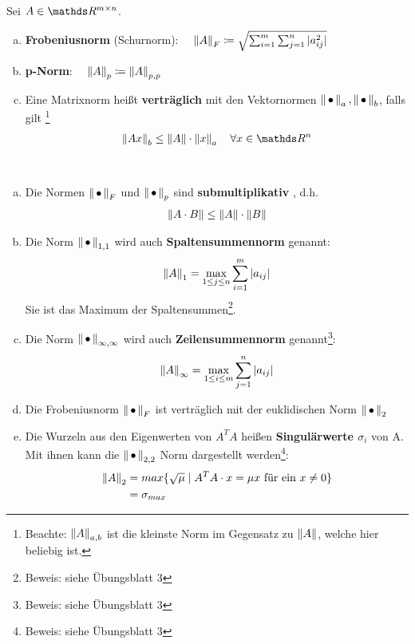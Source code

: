 \begin{Defe}
  \label{3.2.5}
  Sei $A\in \R^{m\times n}$.
  \begin{enumerate}[a)]
  \item \textbf{Frobeniusnorm} (Schurnorm):
    $ \quad \nn[A]_F \coloneqq \sqrt{\sum_{i=1}^{m}\sum_{j=1}^{n}|a_{ij}^2|}
    \index{Norm!Frobeniusnorm}$
  \item \textbf{p-Norm}: 
    $\quad \nn[A]_p \coloneqq \nn[A]_{p,p}
    \index{p-Norm}$
  \item Eine Matrixnorm heißt \textbf{verträglich} 
    mit den Vektornormen $\nn_a, \nn_b$, falls gilt
    \footnote{ Beachte: $\nn[A]_{a,b}$ ist die kleinste Norm 
      im Gegensatz zu $\nn[A]$, welche hier beliebig ist.}
    \begin{gather*}
      \nn[Ax]_b \leq \nn[A]\cdot \nn[x]_a \quad \forall x\in \R^n
    \end{gather*}
  \end{enumerate}
\end{Defe}
\begin{Beme}~
  \label{3.2.6}
  \begin{enumerate}[a)]
  \item Die Normen $\nn_F$ und $\nn_p$ sind 
    \textbf{submultiplikativ} , d.h.
    \begin{gather*}
      \nn[A\cdot B] \leq \nn[A]\cdot\nn[B]
    \end{gather*}
  \item Die Norm $\nn_{1,1}$ wird auch 
    \textbf{Spaltensummennorm} genannt:
    \begin{gather*}
      \nn[A]_1 = \max_{1\leq j \leq n}\sum_{i=1}^{m}|a_{ij}|
    \end{gather*}
    Sie ist das Maximum der Spaltensummen\footnote{Beweis: siehe Übungsblatt 3}.
  \item Die Norm $\nn_{\infty, \infty}$ wird auch 
    \textbf{Zeilensummennorm} 
    genannt\footnote{Beweis: siehe Übungsblatt 3}:
    \begin{gather*}
      \nn[A]_\infty = \max_{1\leq i \leq m}\sum_{j=1}^{n}|a_{ij}|
    \end{gather*}
  \item Die Frobeniusnorm $\nn_F$ ist verträglich 
    mit der euklidischen Norm $\nn_2$
  \item Die Wurzeln aus den Eigenwerten von $A^TA$ 
    heißen \textbf{Singulärwerte $\sigma_i$}  von A.
    Mit ihnen kann die $\nn_{2,2}$ Norm dargestellt werden\footnote{Beweis: siehe Übungsblatt 3}:
    \begin{align*}
      \nn[A]_2 
      &= max \{\sqrt{\mu}\mid A^TA\cdot x=\mu x\text{ für ein }x\neq 0\} \\
      & = \sigma_{max}
    \end{align*}
  \end{enumerate}
\end{Beme}


